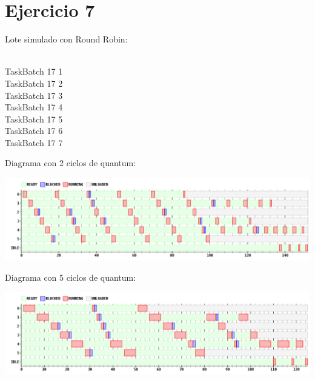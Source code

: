 \section{Ejercicio 7}


Lote simulado con Round Robin:\\\\
\begin {center}
TaskBatch 17 1\\
TaskBatch 17 2\\
TaskBatch 17 3\\
TaskBatch 17 4\\
TaskBatch 17 5\\
TaskBatch 17 6\\
TaskBatch 17 7\\
\end {center}

\par Diagrama con 2 ciclos de quantum:

\begin {center}
\includegraphics[width=16cm]{../simusched/outputs/ej7/rr-ej7-1-2.png}
\end {center}

\par Diagrama con 5 ciclos de quantum:
\begin {center}
\includegraphics[width=16cm]{../simusched/outputs/ej7/rr-ej7-1-5.png}
\end {center}

